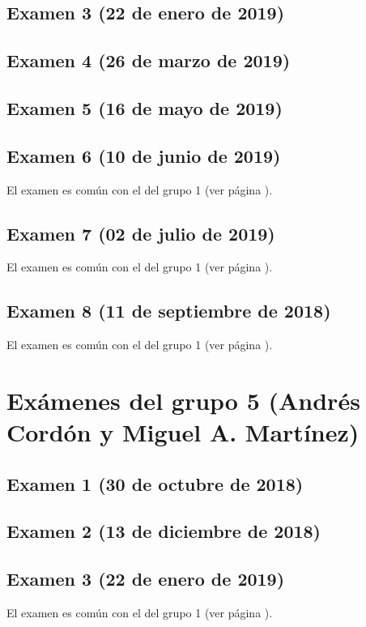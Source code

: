 \documentclass[a4paper,12pt,twoside]{book}
\begin{document}
\subsection{Examen 3 (22 de enero de 2019)}
 \label{examen_18_19_4_3}
\subsection{Examen 4 (26 de marzo de 2019)}
\subsection{Examen 5 (16 de mayo de 2019)}
\subsection{Examen 6 (10 de junio de 2019)}
El examen es común con el del grupo 1 (ver página \pageref{examen_18_19_1_6}).
\subsection{Examen 7 (02 de julio de 2019)}
El examen es común con el del grupo 1 (ver página \pageref{examen_18_19_1_7}).
\subsection{Examen 8 (11 de septiembre de 2018)}
El examen es común con el del grupo 1 (ver página \pageref{examen_18_19_1_8}).

\section{Exámenes del grupo 5 (Andrés Cordón y Miguel A. Martínez)}
\subsection{Examen 1 (30 de octubre de 2018)}
\subsection{Examen 2 (13 de diciembre de 2018)}
\subsection{Examen 3 (22 de enero de 2019)}
El examen es común con el del grupo 1 (ver página \pageref{examen_18_19_4_3}).
\end{document}
